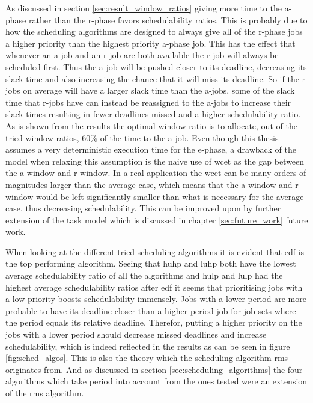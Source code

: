 \documentclass{kththesis}
\begin{document}
As discussed in section \ref{sec:result_window_ratios} giving more time to the \acrshort{a}-phase
rather than the \acrshort{r}-phase favors schedulability ratios. This is probably due to how the
scheduling algorithms are designed to always give all of the \acrshort{r}-phase jobs a higher
priority than the highest priority \acrshort{a}-phase job. This has the effect that whenever an
\acrshort{a}-job and an \acrshort{r}-job are both available the \acrshort{r}-job will always be
scheduled first. Thus the \acrshort{a}-job will be pushed closer to its deadline, decreasing its
slack time and also increasing the chance that it will miss its deadline. So if the
\acrshort{r}-jobs on average will have a larger slack time than the \acrshort{a}-jobs, some of the
slack time that \acrshort{r}-jobs have can instead be reassigned to the \acrshort{a}-jobs to
increase their slack times resulting in fewer deadlines missed and a higher schedulability ratio. As
is shown from the results the optimal window-ratio is to allocate, out of the tried window ratios,
60\% of the time to the \acrshort{a}-job. Even though this thesis assumes a very deterministic
execution time for the \acrshort{e}-phase, a drawback of the model when relaxing this assumption is
the naive use of \acrshort{wcet} as the gap between the \acrshort{a}-window and \acrshort{r}-window.
In a real application the \acrshort{wcet} can be many orders of magnitudes larger than the
average-case, which means that the \acrshort{a}-window and \acrshort{r}-window would be left
significantly smaller than what is necessary for the average case, thus decreasing schedulability.
This can be improved upon by further extension of the task model which is discussed in chapter
\ref{sec:future_work} future work.



When looking at the different tried scheduling algorithms it is evident that \acrshort{edf} is the
top performing algorithm. Seeing that \acrshort{huhp} and \acrshort{luhp} both have the lowest
average schedulability ratio of all the algorithms and \acrshort{hulp} and \acrshort{lulp} had the
highest average schedulability ratios after \acrshort{edf} it seems that prioritising jobs with a
low priority boosts schedulability immensely. Jobs with a lower period are more probable to have its
deadline closer than a higher period job for job sets where the period equals its relative deadline.
Therefor, putting a higher priority on the jobs with a lower period should decrease missed deadlines
and increase schedulability, which is indeed reflected in the results as can be seen in figure
\ref{fig:sched_algos}. This is also the theory which the scheduling algorithm \acrshort{rms}
originates from. And as discussed in section \ref{sec:scheduling_algorithms} the four algorithms
which take period into account from the ones tested were an extension of the \acrshort{rms}
algorithm. 
\end{document}
